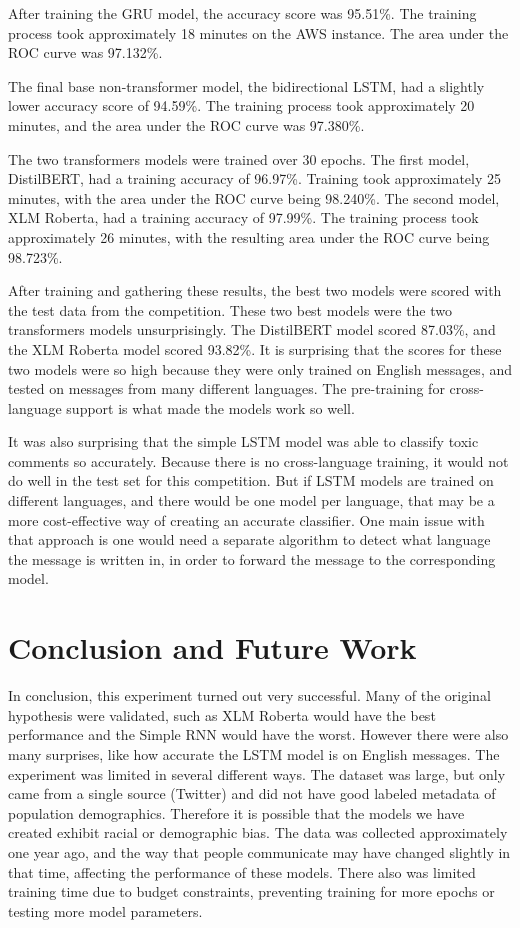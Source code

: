\documentclass{article}
\begin{document}
After training the GRU model, the accuracy score was 95.51\%. The training process took approximately 18 minutes on the AWS instance. The area under the ROC curve was 97.132\%.

The final base non-transformer model, the bidirectional LSTM, had a slightly lower accuracy score of 94.59\%. The training process took approximately 20 minutes, and the area under the ROC curve was 97.380\%.

The two transformers models were trained over 30 epochs. The first model, DistilBERT, had a training accuracy of 96.97\%. Training took approximately 25 minutes, with the area under the ROC curve being 98.240\%. The second model, XLM Roberta, had a training accuracy of 97.99\%. The training process took approximately 26 minutes, with the resulting area under the ROC curve being 98.723\%.

After training and gathering these results, the best two models were scored with the test data from the competition. These two best models were the two transformers models unsurprisingly. The DistilBERT model scored 87.03\%, and the XLM Roberta model scored 93.82\%. It is surprising that the scores for these two models were so high because they were only trained on English messages, and tested on messages from many different languages. The pre-training for cross-language support is what made the models work so well.

It was also surprising that the simple LSTM model was able to classify toxic comments so accurately. Because there is no cross-language training, it would not do well in the test set for this competition. But if LSTM models are trained on different languages, and there would be one model per language, that may be a more cost-effective way of creating an accurate classifier. One main issue with that approach is one would need a separate algorithm to detect what language the message is written in, in order to forward the message to the corresponding model.

\section{Conclusion and Future Work}

In conclusion, this experiment turned out very successful. Many of the original hypothesis were validated, such as XLM Roberta would have the best performance and the Simple RNN would have the worst. However there were also many surprises, like how accurate the LSTM model is on English messages. The experiment was limited in several different ways. The dataset was large, but only came from a single source (Twitter) and did not have good labeled metadata of population demographics. Therefore it is possible that the models we have created exhibit racial or demographic bias. The data was collected approximately one year ago, and the way that people communicate may have changed slightly in that time, affecting the performance of these models. There also was limited training time due to budget constraints, preventing training for more epochs or testing more model parameters.
\end{document}
